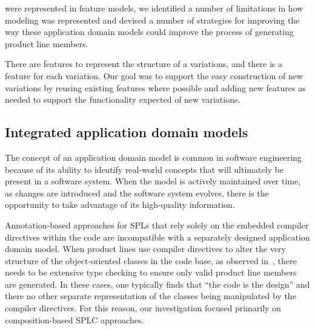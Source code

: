 were represented in feature models, we identified a number of
limitations in how modeling was represented and devised a number of
strategies for improving the way these application domain models could
improve the process of generating product line members.

There are features to represent the structure of a variations, and there
is a feature for each variation. Our goal was to support the easy
construction of new variations by reusing existing features where
possible and adding new features as needed to support the functionality
expected of new variations.

\subsection{Integrated application domain models}

The concept of an application domain model is common in software
engineering because of its ability to identify real-world concepts that
will ultimately be present in a software system. When the model is
actively maintained over time, as changes are introduced and the
software system evolves, there is the opportunity to take advantage of
its high-quality information.

Annotation-based approaches for SPLs that rely solely on the embedded
compiler directives within the code are incompatible with a separately
designed application domain model. When product lines use compiler
directives to alter the very structure of the object-oriented classes in
the code base, as observed in~\cite{Kastner:2012}, there needs to be
extensive type checking to ensure only valid product line members are
generated. In these cases, one typically finds that ``the code is the
design'' and there no other separate representation of the classes being
manipulated by the compiler directives. For this reason, our
investigation focused primarily on composition-based SPLC approaches.

